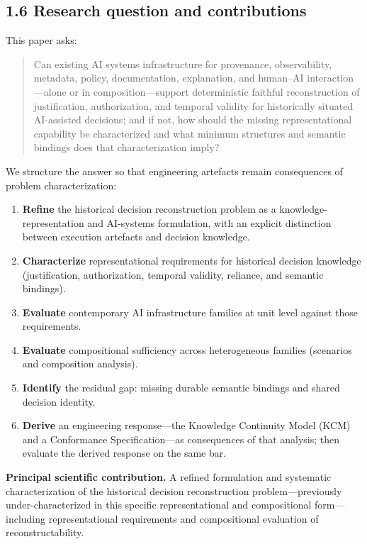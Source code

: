 \documentclass[11pt,a4paper]{article}
\begin{document}
\subsection{1.6 Research question and contributions}

This paper asks:


\begin{quote}
Can existing AI systems infrastructure for provenance, observability, metadata, policy, documentation, explanation, and human--AI interaction---alone or in composition---support deterministic faithful reconstruction of justification, authorization, and temporal validity for historically situated AI-assisted decisions; and if not, how should the missing representational capability be characterized and what minimum structures and semantic bindings does that characterization imply?
\end{quote}

We structure the answer so that engineering artefacts remain consequences of problem characterization:


\begin{enumerate}
\item \textbf{Refine} the historical decision reconstruction problem as a knowledge-representation and AI-systems formulation, with an explicit distinction between execution artefacts and decision knowledge.
\item \textbf{Characterize} representational requirements for historical decision knowledge (justification, authorization, temporal validity, reliance, and semantic bindings).
\item \textbf{Evaluate} contemporary AI infrastructure families at unit level against those requirements.
\item \textbf{Evaluate} compositional sufficiency across heterogeneous families (scenarios and composition analysis).
\item \textbf{Identify} the residual gap: missing durable semantic bindings and shared decision identity.
\item \textbf{Derive} an engineering response---the Knowledge Continuity Model (KCM) and a Conformance Specification---as consequences of that analysis; then evaluate the derived response on the same bar.
\end{enumerate}

\textbf{Principal scientific contribution.} A refined formulation and systematic characterization of the historical decision reconstruction problem---previously under-characterized in this specific representational and compositional form---including representational requirements and compositional evaluation of reconstructability.
\end{document}
